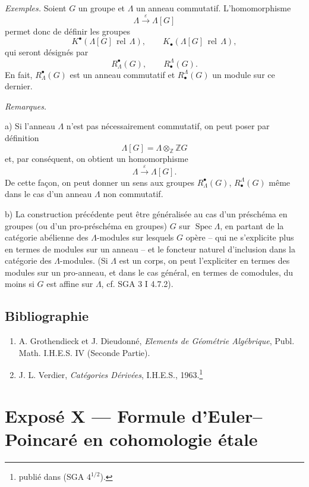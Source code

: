 \documentclass[11pt]{article}
\DeclareMathOperator{\Spec}{Spec}
\providecommand{\Spec}{\operatorname{Spec}}
\providecommand{\Spec}{\operatorname{Spec}}
\providecommand{\Spec}{\operatorname{Spec}}
\providecommand{\Spec}{\operatorname{Spec}}
\begin{document}
\emph{Exemples.} Soient $G$ un groupe et $\Lambda$ un anneau commutatif. L'homomorphisme
\[
\Lambda\xrightarrow{\varepsilon}\Lambda[G]
\]
permet donc de définir les groupes
\[
K^{\bullet}(\Lambda[G]\operatorname{\,rel\,}\Lambda),\qquad
K_\bullet(\Lambda[G]\operatorname{\,rel\,}\Lambda),
\]
qui seront désignés par
\[
R^{\bullet}_\Lambda(G),\qquad R^\Lambda_\bullet(G).
\]
En fait, $R^{\bullet}_\Lambda(G)$ est un anneau commutatif et $R^\Lambda_\bullet(G)$ un module sur ce dernier.

\emph{Remarques.}

a) Si l'anneau $\Lambda$ n'est pas nécessairement commutatif, on peut poser par définition
\[
\Lambda[G]=\Lambda\otimes_{\mathbb Z}\mathbb ZG
\]
et, par conséquent, on obtient un homomorphisme
\[
\Lambda\xrightarrow{\varepsilon}\Lambda[G].
\]
De cette façon, on peut donner un sens aux groupes $R^{\bullet}_\Lambda(G)$, $R^\Lambda_\bullet(G)$ même dans le cas d'un anneau $\Lambda$ non commutatif.

b) La construction précédente peut être généralisée au cas d'un préschéma en groupes (ou d'un pro-préschéma en groupes) $G$ sur $\Spec\Lambda$, en partant de la catégorie abélienne des $\Lambda$-modules sur lesquels $G$ opère -- qui ne s'explicite plus en termes de modules sur un anneau -- et le foncteur naturel d'inclusion dans la catégorie des $\Lambda$-modules. (Si $\Lambda$ est un corps, on peut l'expliciter en termes des modules sur un pro-anneau, et dans le cas général, en termes de comodules, du moins si $G$ est affine sur $\Lambda$, cf. SGA 3 I 4.7.2).

\subsection*{Bibliographie}

\begin{enumerate}
\item[{[1]}] A. Grothendieck et J. Dieudonné, \emph{Elements de Géométrie Algébrique}, Publ. Math. I.H.E.S. IV (Seconde Partie).
\item[{[2]}] J. L. Verdier, \emph{Catégories Dérivées}, I.H.E.S., 1963.\footnote{publié dans (SGA $4^{1/2}$).}
\end{enumerate}

\section*{Exposé X --- Formule d'Euler--Poincaré en cohomologie étale}
\end{document}
